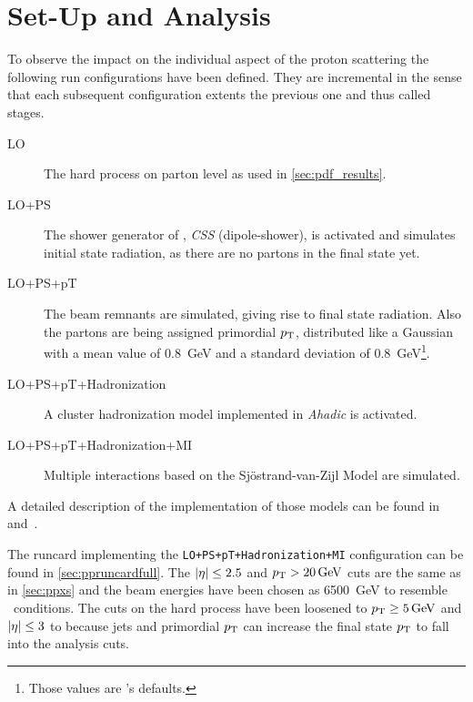 \section{Set-Up and Analysis}%
\label{sec:setupan}

To observe the impact on the individual aspect of the proton
scattering the following run configurations have been defined. They
are incremental in the sense that each subsequent configuration
extents the previous one and thus called stages.
%
\begin{description}
\item[LO] The hard process on parton level as used in \cref{sec:pdf_results}.
\item[LO+PS] The shower generator of \sherpa, \emph{CSS} (dipole-shower),
  is activated and simulates initial state radiation, as there are no
  partons in the final state yet.
\item[LO+PS+pT] The beam remnants are simulated, giving rise to final state radiation.
  Also the partons are being assigned primordial \(p_\mathrm{T}\), distributed
  like a Gaussian with a mean value of \SI{.8}{\giga\electronvolt} and
  a standard deviation of \SI{.8}{\giga\electronvolt}\footnote{Those
    values are \sherpa 's defaults.}.
\item[LO+PS+pT+Hadronization] A cluster hadronization model
  implemented in \emph{Ahadic} is activated.
\item[LO+PS+pT+Hadronization+MI] Multiple interactions based on the
  Sj\"ostrand-van-Zijl Model are simulated.
\end{description}
%
A detailed description of the implementation of those models can be
found in~\cite{Gleisberg:2008ta} and~\cite{Bothmann:2019yzt}.

The runcard implementing the \texttt{LO+PS+pT+Hadronization+MI}
configuration can be found in \cref{sec:ppruncardfull}. The
\(\abs{\eta}\leq 2.5\) and \(p_\mathrm{T} > \SI{20}{\giga\electronvolt}\) cuts
are the same as in \cref{sec:ppxs} and the beam energies have been
chosen as \SI{6500}{\giga\electronvolt} to resemble \lhc\ conditions.
The cuts on the hard process have been loosened to
\(p_\mathrm{T} \geq \SI{5}{\giga\electronvolt}\) and \(\abs{\eta}\leq 3\) to
because jets and primordial \(p_\mathrm{T}\) can increase the final state
\(p_\mathrm{T}\) to fall into the analysis cuts.

